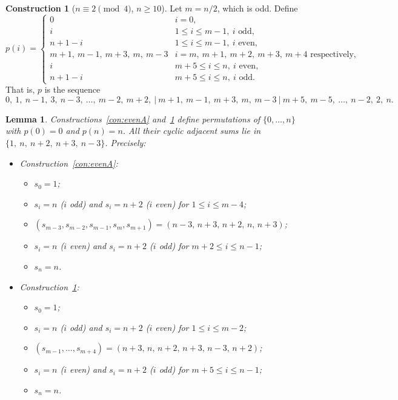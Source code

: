 \documentclass[11pt]{article}
\numberwithin{equation}{section}
\newtheorem{lemma}[theorem]{Lemma}
\theoremstyle{definition}
\newtheorem{construction}[theorem]{Construction}
\theoremstyle{remark}
\begin{document}
\begin{construction}[$n\equiv2\pmod4$, $n\ge10$]\label{con:evenB}
Let $m=n/2$, which is odd. Define
\[
p(i)=\begin{cases}
0 & i=0,\\
i & 1\le i\le m-1,\ i\text{ odd},\\
n+1-i & 1\le i\le m-1,\ i \text{ even},\\
m+1,\ m-1,\ m+3,\ m,\ m-3 & i=m,\ m+1,\ m+2,\ m+3,\ m+4 \text{ respectively},\\
i & m+5\le i\le n,\ i\text{ even},\\
n+1-i & m+5\le i\le n,\ i\text{ odd}.
\end{cases}
\]
That is, $p$ is the sequence
\[
0,\ 1,\ n-1,\ 3,\ n-3,\ \dots,\ m-2,\ m+2,\ \big|\ m+1,\ m-1,\ m+3,\ m,\ m-3\ \big|\ m+5,\ m-5,\ \dots,\ n-2,\ 2,\ n.
\]
\end{construction}

\begin{lemma}\label{lem:evenAB}
Constructions~\ref{con:evenA} and~\ref{con:evenB} define permutations of $\{0,\dots,n\}$ with $p(0)=0$ and $p(n)=n$. All
their cyclic adjacent sums lie in $\{1,\ n,\ n+2,\ n+3,\ n-3\}$. Precisely:
\begin{itemize}
  \item Construction~\ref{con:evenA}:
  \begin{itemize}
    \item $s_0=1$;
    \item $s_i=n$ ($i$ odd) and $s_i=n+2$ ($i$ even) for $1\le i\le m-4$;
    \item $(s_{m-3},s_{m-2},s_{m-1},s_m,s_{m+1})=(n-3,\,n+3,\,n+2,\,n,\,n+3)$;
    \item $s_i=n$ ($i$ even) and $s_i=n+2$ ($i$ odd) for $m+2\le i\le n-1$;
    \item $s_n=n$.
  \end{itemize}
  \item Construction~\ref{con:evenB}:
  \begin{itemize}
    \item $s_0=1$;
    \item $s_i=n$ ($i$ odd) and $s_i=n+2$ ($i$ even) for $1\le i\le m-2$;
    \item $(s_{m-1},\dots,s_{m+4})=(n+3,\,n,\,n+2,\,n+3,\,n-3,\,n+2)$;
    \item $s_i=n$ ($i$ even) and $s_i=n+2$ ($i$ odd) for $m+5\le i\le n-1$;
    \item $s_n=n$.
  \end{itemize}
\end{itemize}
\end{lemma}
\end{document}
